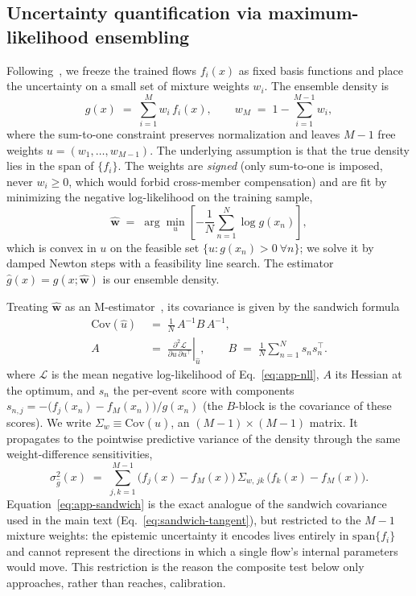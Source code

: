\subsection{Uncertainty quantification via maximum-likelihood ensembling}
\label{app:wifi}
Following~\citep{Sean}, we freeze the trained flows $f_i(x)$ as fixed basis
functions and place the uncertainty on a small set of mixture weights $w_i$. The
ensemble density is
\begin{equation}\label{eq:app-g}
  g(x) \;=\; \sum_{i=1}^{M} w_i\, f_i(x),
  \qquad w_M \;=\; 1 - \sum_{i=1}^{M-1} w_i ,
\end{equation}
where the sum-to-one constraint preserves normalization and leaves $M-1$ free
weights $u=(w_1,\dots,w_{M-1})$. The underlying assumption is that the true
density lies in the span of $\{f_i\}$. The weights are \emph{signed} (only
sum-to-one is imposed, never $w_i\ge0$, which would forbid cross-member
compensation) and are fit by minimizing the negative log-likelihood on the
training sample,
\begin{equation}\label{eq:app-nll}
  \hat{\boldsymbol w}
  \;=\; \arg\min_{u}\left[-\frac1N \sum_{n=1}^{N} \log g(x_n)\right],
\end{equation}
which is convex in $u$ on the feasible set $\{u: g(x_n)>0\ \forall n\}$; we solve
it by damped Newton steps with a feasibility line search. The estimator
$\hat g(x)=g(x;\hat{\boldsymbol w})$ is our ensemble density.

Treating $\hat{\boldsymbol w}$ as an M-estimator~\citep{Huber}, its covariance is
given by the sandwich formula~\citep{White1982}
\begin{equation}\label{eq:app-sandwich}
\begin{aligned}
  \mathrm{Cov}(\hat u) &\;=\; \frac1N\, A^{-1} B\, A^{-1}, \\
  A &\;=\; \left.\frac{\partial^2 \mathcal L}{\partial u\,\partial u^\top}\right|_{\hat u},
  \qquad
  B \;=\; \frac1N\sum_{n=1}^N s_n s_n^\top .
\end{aligned}
\end{equation}
where $\mathcal L$ is the mean negative log-likelihood of Eq.~\eqref{eq:app-nll},
$A$ its Hessian at the optimum, and $s_{n}$ the per-event score with components
$s_{n,j} = -\big(f_j(x_n)-f_M(x_n)\big)/g(x_n)$ (the $B$-block is the covariance of
these scores). We write $\Sigma_w \equiv \mathrm{Cov}(\hat u)$, an
$(M{-}1)\times(M{-}1)$ matrix. It propagates to the pointwise predictive variance
of the density through the same weight-difference sensitivities,
\begin{equation}\label{eq:app-predvar}
  \sigma_{\hat g}^2(x)
  \;=\; \sum_{j,k=1}^{M-1}\big(f_j(x)-f_M(x)\big)\,
        \Sigma_{w,\,jk}\,
        \big(f_k(x)-f_M(x)\big).
\end{equation}
Equation~\eqref{eq:app-sandwich} is the exact analogue of the sandwich covariance
used in the main text (Eq.~\eqref{eq:sandwich-tangent}), but restricted to the
$M-1$ mixture weights: the epistemic uncertainty it encodes lives entirely in
$\mathrm{span}\{f_i\}$ and cannot represent the directions in which a single
flow's internal parameters would move. This restriction is the reason the
composite test below only approaches, rather than reaches, calibration.


